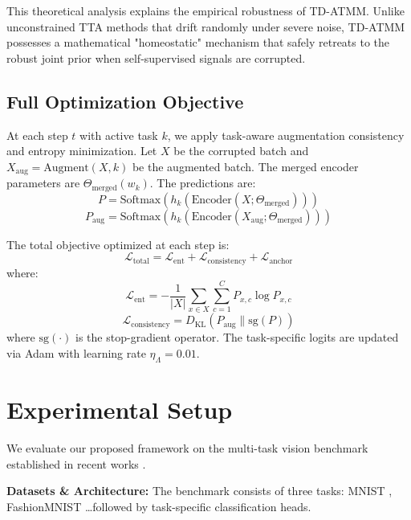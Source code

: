 \documentclass{article}
\theoremstyle{plain}
\theoremstyle{definition}
\theoremstyle{remark}
\begin{document}
This theoretical analysis explains the empirical robustness of TD-ATMM. Unlike unconstrained TTA methods that drift randomly under severe noise, TD-ATMM possesses a mathematical "homeostatic" mechanism that safely retreats to the robust joint prior when self-supervised signals are corrupted.

\subsection{Full Optimization Objective}
At each step $t$ with active task $k$, we apply task-aware augmentation consistency and entropy minimization. Let $X$ be the corrupted batch and $X_{\text{aug}} = \text{Augment}(X, k)$ be the augmented batch. The merged encoder parameters are $\Theta_{\text{merged}}(w_k)$. The predictions are:
\begin{equation}
P = \text{Softmax}(h_k(\text{Encoder}(X; \Theta_{\text{merged}})))
\end{equation}
\begin{equation}
P_{\text{aug}} = \text{Softmax}(h_k(\text{Encoder}(X_{\text{aug}}; \Theta_{\text{merged}})))
\end{equation}

The total objective optimized at each step is:
\begin{equation}
\mathcal{L}_{\text{total}} = \mathcal{L}_{\text{ent}} + \mathcal{L}_{\text{consistency}} + \mathcal{L}_{\text{anchor}}
\end{equation}
where:
\begin{equation}
\mathcal{L}_{\text{ent}} = -\frac{1}{|X|} \sum_{x \in X} \sum_{c=1}^C P_{x, c} \log P_{x, c}
\end{equation}
\begin{equation}
\mathcal{L}_{\text{consistency}} = D_{\text{KL}}(P_{\text{aug}} \parallel \text{sg}(P))
\end{equation}
where $\text{sg}(\cdot)$ is the stop-gradient operator. The task-specific logits are updated via Adam with learning rate $\eta_{\Lambda} = 0.01$.

\section{Experimental Setup}
We evaluate our proposed framework on the multi-task vision benchmark established in recent works \cite{sata2026, s2cmerge2026}.

\textbf{Datasets \& Architecture:} The benchmark consists of three tasks: MNIST \cite{mnist1998}, FashionMNIST \dots followed by task-specific classification heads.
\end{document}

